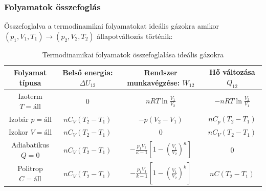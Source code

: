 \documentclass[../main.tex]{subfiles}
\begin{document}
\subsubsection*{Folyamatok összefoglás}
Összefoglalva a termodinamikai folyamatokat ideális gázokra amikor $(p_1, V_1, T_1) \to (p_2, V_2, T_2)$ állapotváltozás történik:
\begin{table}[H]
    \centering
    \begin{tabular}{|c|c|c|c|}
        \hline
        Folyamat típusa & Belső energia: $\Delta U_{12}$ & Rendszer munkavégzése: $W_{12}$ & Hő változása $Q_{12}$ \\
        \hline
        Izoterm $T = \text{áll}$ & $0$ & $nRT \ln{\frac{V_1}{V_2}}$ & $- nRT \ln{\frac{V_2}{V_1}}$ \\
        \hline
        Izobár $p = \text{áll}$ & $nC_V (T_2 - T_1)$ & $- p (V_2 - V_1)$ & $n C_p (T_2 - T_1)$ \\
        \hline
        Izokor $V = \text{áll}$ & $nC_V (T_2 - T_1)$ & $0$ & $n C_V (T_2 - T_1)$ \\
        \hline
        Adiabatikus $Q = 0$ & $nC_V (T_2 - T_1)$ & $- \frac{p_1V_1}{\kappa-1}\left[1- (\frac{V_1}{V_2})^\kappa\right]$ & $0$ \\
        \hline
        Politrop $C = \text{áll}$ & $nC_V (T_2 - T_1)$ & $- \frac{p_1V_1}{k-1}\left[1- (\frac{V_1}{V_2})^k\right]$ & $n C (T_2 - T_1)$ \\
        \hline
    \end{tabular}
    \caption{Termodinamikai folyamatok összefoglalása ideális gázokra}
\end{table}
\end{document}
